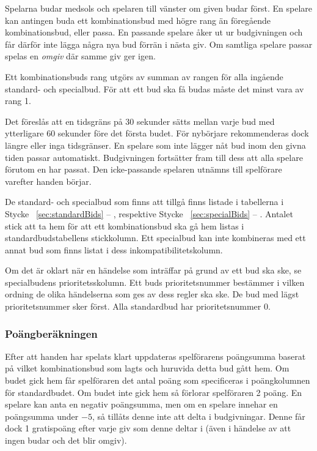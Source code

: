 \documentclass[a4paper]{article} %
\renewcommand{\sectionref}[1]{%
	\ref{sec:#1} -- \nameref{sec:#1}%
}
\begin{document}
	Spelarna budar medsols och spelaren till vänster om given budar först. En spelare kan antingen buda ett kombinationsbud med högre rang än föregående kombinationsbud, eller passa. En passande spelare åker ut ur budgivningen och får därför inte lägga några nya bud förrän i nästa giv. Om samtliga spelare passar spelas en \emph{omgiv} där samme giv ger igen.

	Ett kombinationsbuds rang utgörs av summan av rangen för alla ingående standard- och specialbud. För att ett bud ska få budas måste det minst vara av rang 1.

	Det föreslås att en tidsgräns på 30 sekunder sätts mellan varje bud med ytterligare 60 sekunder före det första budet. För nybörjare rekommenderas dock längre eller inga tidsgränser. En spelare som inte lägger nåt bud inom den givna tiden passar automatiskt. Budgivningen fortsätter fram till dess att alla spelare förutom en har passat. Den icke-passande spelaren utnämns till spelförare varefter handen börjar.

	De standard- och specialbud som finns att tillgå finns listade i tabellerna i Stycke~\sectionref{standardBids}, respektive Stycke~\sectionref{specialBids}. Antalet stick att ta hem för att ett kombinationsbud ska gå hem listas i standardbudstabellens stickkolumn. Ett specialbud kan inte kombineras med ett annat bud som finns listat i dess inkompatibilitetskolumn.

	Om det är oklart när en händelse som inträffar på grund av ett bud ska ske, se specialbudens prioritetsskolumn. Ett buds prioritetsnummer bestämmer i vilken ordning de olika händelserna som ges av dess regler ska ske. De bud med lägst prioritetsnummer sker först. Alla standardbud har prioritetsnummer 0.

	\subsubsection{Poängberäkningen}
	Efter att handen har spelats klart uppdateras spelförarens poängsumma baserat på vilket kombinationsbud som lagts och huruvida detta bud gått hem. Om budet gick hem får spelföraren det antal poäng som specificeras i poängkolumnen för standardbudet. Om budet inte gick hem så förlorar spelföraren 2 poäng. En spelare kan anta en negativ poängsumma, men om en spelare innehar en poängsumma under $-5$, så tillåts denne inte att delta i budgivningar. Denne får dock 1 gratispoäng efter varje giv som denne deltar i (även i händelse av att ingen budar och det blir omgiv).
\end{document}
